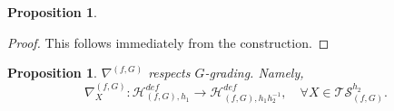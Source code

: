 \documentclass[reqno,12pt]{amsart}
\numberwithin{equation}{section}
\theoremstyle{plain}
\newtheorem{proposition}[theorem]{Proposition}
\theoremstyle{definition}
\newcommand{\id}{\mathrm{id}}
\def\H{{\mathcal H}}
\def\T{{\mathcal T}}
\numberwithin{equation}{section}
\begin{document}
\begin{proposition}{\label{MainProp2}}
%  
  
\end{proposition}

\begin{proof}  
This follows immediately from the construction.
\end{proof}

\begin{proposition}{\label{G-resp}}
$\nabla^{(f,G)}$ respects $G$-grading. Namely,
\[
    \nabla^{(f,G)}_{X}: \H^{def}_{(f,G),h_1} \to \H^{def}_{(f,G),h_1h_2^{-1}}, \quad \forall X \in \T \mathcal{S}_{(f,G)}^{h_2}.
\]
\end{proposition}
\end{document}
